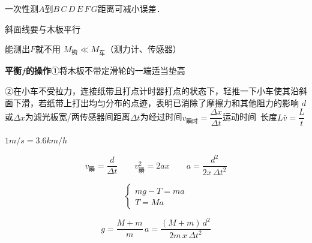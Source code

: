 \begin{center}
一次性测$A$到$B\,C\,D\,E\,F\,G$距离可减小误差．
\end{center}
斜面线要与木板平行 %

能测出$F$就不用 $M_{\text{钩}}\ll M_{\text{车}}$（测力计、传感器）


\textbf{平衡$f$的操作}\quad ①将木板不带定滑轮的一端适当垫高

\hspace{5em}②在小车不受拉力，连接纸带且打点计时器打点的状态下，轻推一下小车使其沿斜面下滑，若纸带上打出均匀分布的点迹，表明已消除了摩擦力和其他阻力的影响
$d$或$\Delta x$为滤光板宽/两传感器间距离\quad $\Delta t$为经过时间\quad $v_{\text{瞬时}}=\dfrac{\Delta x}{\Delta t}$\quad 运动时间\ 长度$L$\quad $\bar v=\dfrac{L}{t}$ %

$1\unit{m/s}=3.6\unit{km/h}$

\[
v_{\text{瞬}}=\frac{d}{\Delta t}\qquad v_{\text{瞬}}^2=2ax\qquad a=\frac{d^2}{2x\,\Delta t^2}
\]

\[
\begin{cases} mg-T=ma\\ T=Ma\end{cases}
\]

\[
g=\frac{M+m}{m}\,a=\frac{(M+m)\,d^2}{2m\,x\,\Delta t^2}
\]
